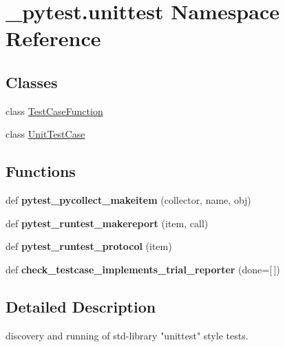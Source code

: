 \hypertarget{namespace__pytest_1_1unittest}{}\section{\+\_\+pytest.\+unittest Namespace Reference}
\label{namespace__pytest_1_1unittest}
\subsection*{Classes}
\begin{DoxyCompactItemize}
\item 
class \hyperlink{class__pytest_1_1unittest_1_1_test_case_function}{Test\+Case\+Function}
\item 
class \hyperlink{class__pytest_1_1unittest_1_1_unit_test_case}{Unit\+Test\+Case}
\end{DoxyCompactItemize}
\subsection*{Functions}
\begin{DoxyCompactItemize}
\item 
\mbox{\label{namespace__pytest_1_1unittest_adbcc1f9635f9e61b5cab18f5c01eff56}} 
def {\bfseries pytest\+\_\+pycollect\+\_\+makeitem} (collector, name, obj)
\item 
\mbox{\label{namespace__pytest_1_1unittest_a3312ccb2245ba316353d2ffe3a4c6645}} 
def {\bfseries pytest\+\_\+runtest\+\_\+makereport} (item, call)
\item 
\mbox{\label{namespace__pytest_1_1unittest_a45c99985633f0926bf1f403af8729e34}} 
def {\bfseries pytest\+\_\+runtest\+\_\+protocol} (item)
\item 
\mbox{\label{namespace__pytest_1_1unittest_a80aa332156ce536e49ad8bfbbe589018}} 
def {\bfseries check\+\_\+testcase\+\_\+implements\+\_\+trial\+\_\+reporter} (done=\mbox{[}$\,$\mbox{]})
\end{DoxyCompactItemize}


\subsection{Detailed Description}
\begin{DoxyVerb}discovery and running of std-library "unittest" style tests. \end{DoxyVerb}
 